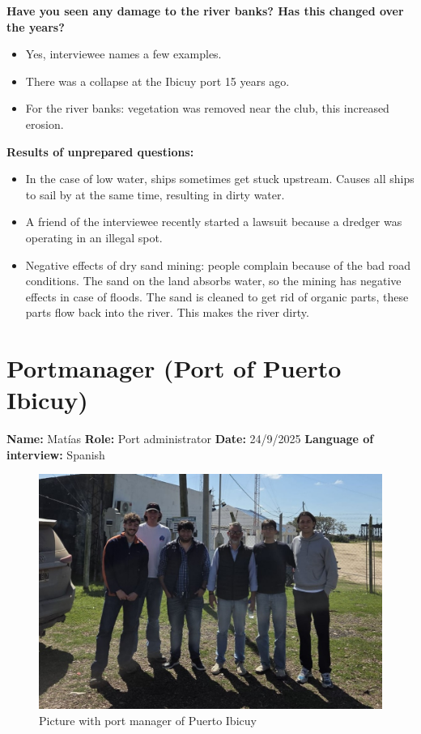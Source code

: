 \textbf{Have you seen any damage to the river banks? Has this changed over the years?}
\begin{itemize}
    \item Yes, interviewee names a few examples.
    \item There was a collapse at the Ibicuy port 15 years ago.
    \item For the river banks: vegetation was removed near the club, this increased erosion.
\end{itemize}

\textbf{Results of unprepared questions:}
\begin{itemize}
    \item In the case of low water, ships sometimes get stuck upstream. Causes all ships to sail by at the same time, resulting in dirty water.
    \item A friend of the interviewee recently started a lawsuit because a dredger was operating in an illegal spot.
    \item Negative effects of dry sand mining: people complain because of the bad road conditions. The sand on the land absorbs water, so the mining has negative effects in case of floods. The sand is cleaned to get rid of organic parts, these parts flow back into the river. This makes the river dirty.
\end{itemize}

\newpage
\section{Portmanager (Port of Puerto Ibicuy)}
\textbf{Name:} Matías \newline
\textbf{Role:} Port administrator \newline
\textbf{Date:} 24/9/2025 \newline
\textbf{Language of interview:} Spanish

\begin{figure}[H]
    \centering
    \includegraphics[width=0.5\linewidth]{figures/appendixE/InterviewPort.jpeg}
    \caption{Picture with port manager of Puerto Ibicuy}
\end{figure}

